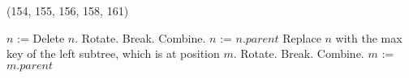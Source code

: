 \begin{theorem}{(154, 155, 156, 158, 161)}
\begin{itemize}
\begin{itemize}
\begin{algorithm}[H]
\begin{algorithmic}[1]
                        \State $n$ := 
                            \State Delete $n$.
                                    \State Rotate.
                                    \State Break.
                                \Else
                                    \State Combine.
                                    \State $n$ := $n.parent$
                                \EndIf
                            \EndWhile
                        \Else {}
                            \State Replace $n$ with the max key of the left subtree, which is at position $m$.
                             
                                    \State Rotate.
                                    \State Break.
                                \Else
                                    \State Combine.
                                    \State $m$ := $m.parent$
                                \EndIf
                            \EndWhile
                        \EndIf
                    \EndFunction
                \end{algorithmic}
            \end{algorithm}
        \end{itemize}
    \end{itemize}
\end{theorem}

